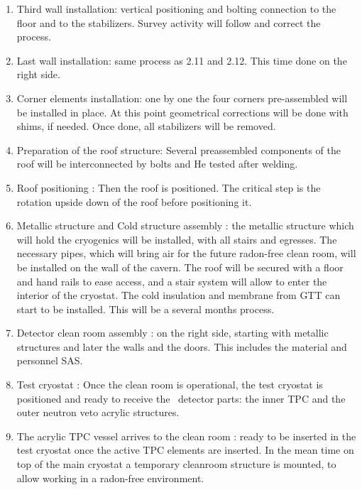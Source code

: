 \begin{enumerate}
\item Third wall installation: vertical positioning and bolting connection to the floor and to the stabilizers. Survey activity will follow and correct the process.
  
\item Last wall installation: same process as 2.11 and 2.12. This time done on the right side.

\item Corner elements installation: one by one the four corners pre-assembled will be installed in place. At this point geometrical corrections will be done with shims, if needed. Once done, all stabilizers will be removed.

\item Preparation of the roof structure: Several preassembled components of the roof will be interconnected by bolts and He tested after welding.
 
\item Roof positioning : Then the roof is positioned. The critical step is the rotation upside down of the roof before positioning it.
 
\item Metallic structure and Cold structure assembly : the metallic structure which will hold the cryogenics will be installed, with all stairs and egresses. The necessary pipes, which will bring air for the future radon-free clean room, will be installed on the wall of the cavern. The roof will be secured with a floor and hand rails to ease access, and a stair system will allow to enter the interior of the cryostat. The cold insulation and membrane from GTT can start to be installed. This will be a several months process.
 
\item Detector clean room assembly : on the right side, starting with metallic structures and later the walls and the doors. This includes the material and personnel SAS.
 
\item Test cryostat : Once the clean room is operational, the test cryostat is positioned and ready to receive the \DSks\ detector parts: the inner TPC and the outer neutron veto acrylic structures.
 
\item The acrylic TPC vessel arrives to the clean room : ready to be inserted in the test cryostat once the active TPC elements are inserted. In the mean time on top of the main cryostat a temporary cleanroom structure is mounted, to allow working in a radon-free environment.
 

\end{enumerate}
